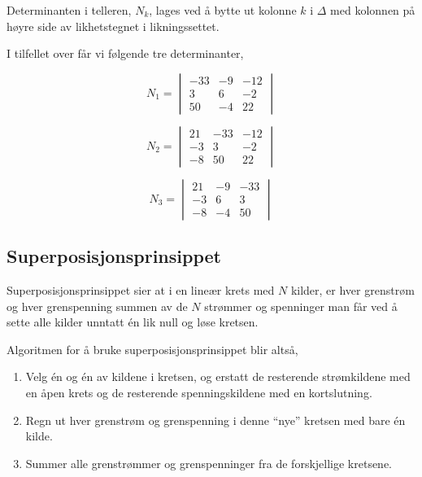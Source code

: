 \documentclass[norsk, a4paper, 12pt, twoside, titlepage]{article}
\begin{document}
Determinanten i telleren, $N_{k}$, lages ved å bytte ut kolonne $k$ i
$\Delta$ med kolonnen på høyre side av likhetstegnet i likningssettet.

I tilfellet over får vi følgende tre determinanter,

\begin{equation}
N_{1} = \begin{vmatrix}-33 & -9 & -12 \\ 3 & 6 & -2 \\ 50 & -4 &
    22\end{vmatrix}
\end{equation}

\begin{equation}
N_{2} = \begin{vmatrix}21 & -33 & -12 \\ -3 & 3 & -2 \\ -8 & 50 &
    22\end{vmatrix}
\end{equation}

\begin{equation}
N_{3} = \begin{vmatrix}21 & -9 & -33 \\ -3 & 6 & 3 \\ -8 & -4 &
    50\end{vmatrix}
\end{equation}


\subsection{Superposisjonsprinsippet}
Superposisjonsprinsippet sier at i en lineær krets med $N$ kilder, er
hver grenstrøm og hver grenspenning summen av de $N$ strømmer og
spenninger man får ved å sette alle kilder unntatt én lik null og løse
kretsen.

Algoritmen for å bruke superposisjonsprinsippet blir altså,
\begin{enumerate}
\item Velg én og én av kildene i kretsen, og erstatt de resterende
  strømkildene med en åpen krets og de resterende spenningskildene med
  en kortslutning.
\item Regn ut hver grenstrøm og grenspenning i denne ``nye'' kretsen
  med bare én kilde.
\item Summer alle grenstrømmer og grenspenninger fra de forskjellige
  kretsene.
\end{enumerate}
\end{document}
